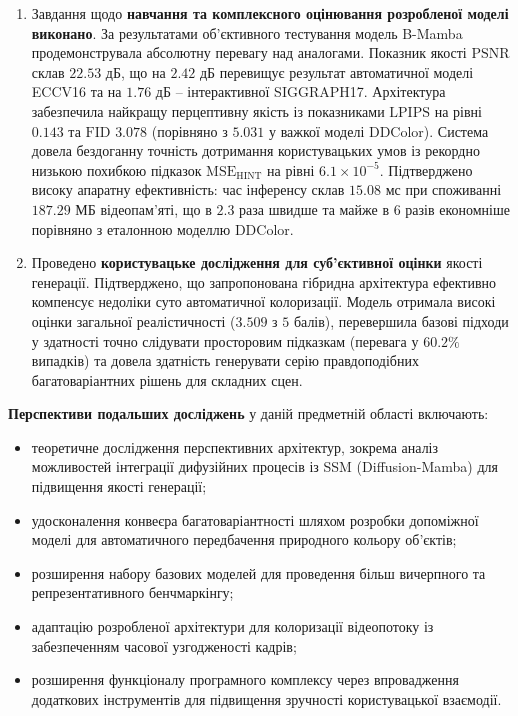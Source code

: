 \begin{enumerate}
        \item Завдання щодо \textbf{навчання та комплексного оцінювання розробленої моделі виконано}.
            За результатами об'єктивного тестування модель B-Mamba продемонструвала абсолютну перевагу над аналогами.
            Показник якості $\mathrm{PSNR}$ склав $22.53$ дБ, що на $2.42$ дБ перевищує результат автоматичної моделі ECCV16 та на $1.76$ дБ -- інтерактивної SIGGRAPH17.
            Архітектура забезпечила найкращу перцептивну якість із показниками $\mathrm{LPIPS}$ на рівні $0.143$ та $\mathrm{FID}$ $3.078$ (порівняно з $5.031$ у важкої моделі DDColor).
            Система довела бездоганну точність дотримання користувацьких умов із рекордно низькою похибкою підказок $\mathrm{MSE}_{\mathrm{HINT}}$ на рівні $6.1 \times 10^{-5}$.
            Підтверджено високу апаратну ефективність: час інференсу склав $15.08$ мс при споживанні $187.29$ МБ відеопам'яті, що в $2.3$ раза швидше та майже в $6$ разів економніше порівняно з еталонною моделлю DDColor.

        \item Проведено \textbf{користувацьке дослідження для суб'єктивної оцінки} якості генерації.
            Підтверджено, що запропонована гібридна архітектура ефективно компенсує недоліки суто автоматичної колоризації. 
            Модель отримала високі оцінки загальної реалістичності ($3.509$ з $5$ балів), перевершила базові підходи у здатності точно слідувати просторовим підказкам (перевага у $60.2\%$ випадків) та довела здатність генерувати серію правдоподібних багатоваріантних рішень для складних сцен.
    \end{enumerate}

    \textbf{Перспективи подальших досліджень} у даній предметній області включають:
    \begin{itemize}[label=$\bullet$]
        \item теоретичне дослідження перспективних архітектур, зокрема аналіз можливостей інтеграції дифузійних процесів із SSM (Diffusion-Mamba) для підвищення якості генерації;
        \item удосконалення конвеєра багатоваріантності шляхом розробки допоміжної моделі для автоматичного передбачення природного кольору об'єктів;
        \item розширення набору базових моделей для проведення більш вичерпного та репрезентативного бенчмаркінгу;
        \item адаптацію розробленої архітектури для колоризації відеопотоку із забезпеченням часової узгодженості кадрів;
        \item розширення функціоналу програмного комплексу через впровадження додаткових інструментів для підвищення зручності користувацької взаємодії.
    \end{itemize}

